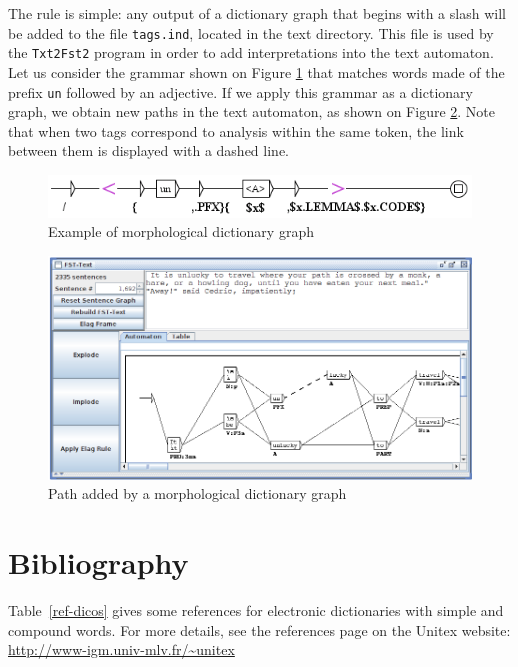 \bigskip
\noindent The rule is simple: any output of a dictionary graph that begins
with a slash will be added to the file \verb+tags.ind+, 
located in the text directory. This file is used by the \verb+Txt2Fst2+ program
in order to add interpretations into the text automaton. Let us consider the
grammar shown on Figure \ref{morphoA} that matches words made of the prefix
\verb+un+ followed by an adjective. If we apply this grammar as a dictionary
graph, we obtain new paths in the text automaton, as shown on Figure
\ref{morphoB}. Note that when two tags correspond to analysis within the same
token, the link between them is displayed with a dashed line.

\begin{figure}[!ht]
\begin{center}
\includegraphics[width=14cm]{resources/img/fig3-14a.png}
\caption{Example of morphological dictionary graph\label{morphoA}}
\end{center}
\end{figure}

\begin{figure}[!ht]
\begin{center}
\includegraphics[width=15cm]{resources/img/fig3-14b.png}
\caption{Path added by a morphological dictionary
graph\label{morphoB}}
\end{center}
\end{figure}


\section{Bibliography}


Table~\ref{ref-dicos} gives some references for electronic dictionaries with simple and 
compound words. For more details, see the references page on the Unitex website: \\
\url{http://www-igm.univ-mlv.fr/~unitex}

